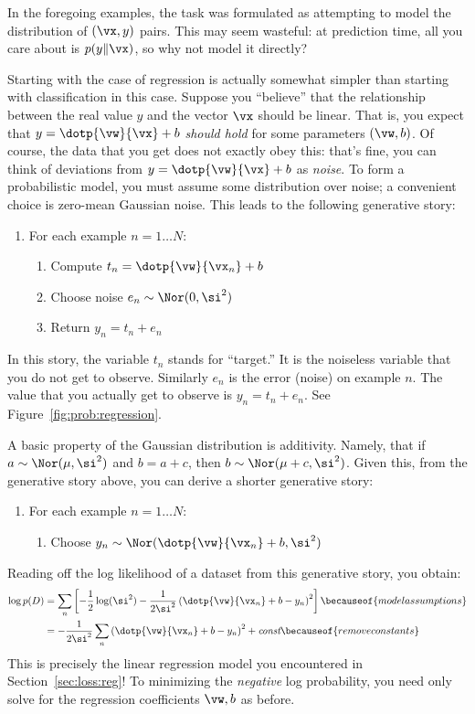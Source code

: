 In the foregoing examples, the task was formulated as attempting to
model the  distribution of $(\vx,y)$ pairs.  This may
seem wasteful: at prediction time, all you care about is $p(y\|\vx)$,
so why not model it directly?

Starting with the case of regression is actually somewhat simpler than
starting with classification in this case.  Suppose you ``believe''
that the relationship between the real value $y$ and the vector $\vx$
should be linear.  That is, you expect that $y = \dotp{\vw}{\vx}+b$
\emph{should hold} for some parameters $(\vw,b)$.  Of course, the data
that you get does not exactly obey this: that's fine, you can think of
deviations from $y = \dotp{\vw}{\vx}+b$ as \emph{noise}.  To form a
probabilistic model, you must assume some distribution over noise; a
convenient choice is zero-mean Gaussian noise.  This leads to the
following generative story:
%
\begin{enumerate}
  \item For each example $n=1 \dots N$:
    \begin{enumerate}
      \item Compute $t_n = \dotp{\vw}{\vx_n} + b$
      \item Choose noise $e_n \sim \Nor(0, \si^2)$
      \item Return $y_n = t_n + e_n$
    \end{enumerate}
\end{enumerate}
%
In this story, the variable $t_n$ stands for ``target.''  It is the
noiseless variable that you do not get to observe.  Similarly $e_n$ is
the error (noise) on example $n$.  The value that you actually get to
observe is $y_n = t_n + e_n$.  See Figure~\ref{fig:prob:regression}.


A basic property of the Gaussian distribution is additivity.  Namely,
that if $a \sim \Nor(\mu,\si^2)$ and $b = a + c$, then $b \sim
\Nor(\mu+c,\si^2)$.  Given this, from the generative story above, you
can derive a shorter generative story:
%
\begin{enumerate}
  \item For each example $n=1 \dots N$:
    \begin{enumerate}
      \item Choose $y_n \sim \Nor( \dotp{\vw}{\vx_n} + b, \si^2)$
    \end{enumerate}
\end{enumerate}
%
Reading off the log likelihood of a dataset from this generative
story, you obtain:
%
\begin{align}
   \log p(D)
&= \sum_n \left[
     - \frac 1 2 \log(\si^2)
     - \frac 1 {2 \si^2} \left( \dotp{\vw}{\vx_n} + b - y_n \right)^2
     \right]
   \becauseof{model assumptions}\\
&= - \frac 1 {2 \si^2}  \sum_n \left( \dotp{\vw}{\vx_n} + b - y_n \right)^2
   + \textit{const}
   \becauseof{remove constants}
\end{align}
%
This is precisely the linear regression model you encountered in
Section~\ref{sec:loss:reg}!  To minimizing the \emph{negative} log
probability, you need only solve for the regression coefficients
$\vw,b$ as before.

